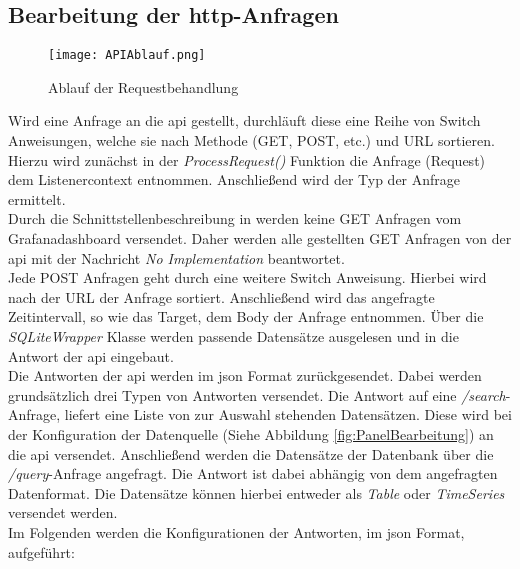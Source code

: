 \subsection{Bearbeitung der \ac{http}-Anfragen}
\begin{wrapfigure}{r}{0.55\textwidth}
    \captionsetup{justification=centering,format=plain, font=small}
    \vspace{-1.2cm}
    \begin{center}
      \texttt{[image: APIAblauf.png]}
    \end{center}
    \vspace{-0.5cm}
    \caption{Ablauf der Requestbehandlung}
    \label{fig:APIAblauf}
    \vspace{-0.5cm}
  \end{wrapfigure}
Wird eine Anfrage an die \ac{api} gestellt, durchläuft diese eine Reihe von Switch Anweisungen, welche sie nach Methode (GET, POST, etc.) und URL sortieren. Hierzu wird zunächst in der \textit{ProcessRequest()} Funktion die Anfrage (Request) dem Listenercontext entnommen. Anschließend wird der Typ der Anfrage ermittelt.\\
Durch die Schnittstellenbeschreibung in \cite{SimpleJSON} werden keine GET Anfragen vom Grafanadashboard versendet. Daher werden alle gestellten GET Anfragen von der \ac{api} mit der Nachricht \glqq\textit{No Implementation}\grqq{} beantwortet.\\
Jede POST Anfragen geht durch eine weitere Switch Anweisung. Hierbei wird nach der URL der Anfrage sortiert. Anschließend wird das angefragte Zeitintervall, so wie das Target, dem Body der Anfrage entnommen. Über die \textit{SQLiteWrapper} Klasse werden passende Datensätze ausgelesen und in die Antwort der \ac{api} eingebaut.\\   
Die Antworten der \ac{api} werden im \ac{json} Format zurückgesendet. Dabei werden grundsätzlich drei Typen von Antworten versendet. Die Antwort auf eine \textit{/search}-Anfrage, liefert eine Liste von zur Auswahl stehenden Datensätzen. Diese wird bei der Konfiguration der Datenquelle (Siehe Abbildung \ref{fig:PanelBearbeitung}) an die \ac{api} versendet. Anschließend werden die Datensätze der Datenbank über die \textit{/query}-Anfrage angefragt. Die Antwort ist dabei abhängig von dem angefragten Datenformat. Die Datensätze können hierbei entweder als \textit{Table} oder \textit{TimeSeries} versendet werden.\\
Im Folgenden werden die Konfigurationen der Antworten, im \ac{json} Format, aufgeführt:
